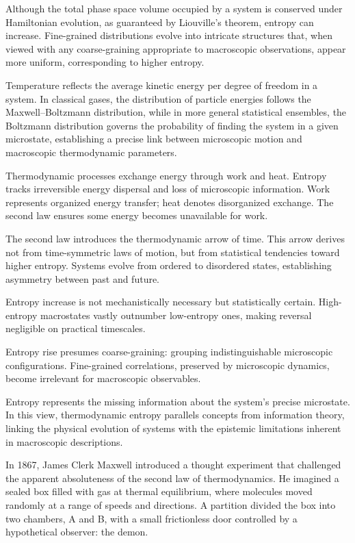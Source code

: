 Although the total phase space volume occupied by a system is conserved under Hamiltonian evolution, as guaranteed by Liouville's theorem, entropy can increase. Fine-grained distributions evolve into intricate structures that, when viewed with any coarse-graining appropriate to macroscopic observations, appear more uniform, corresponding to higher entropy.

Temperature reflects the average kinetic energy per degree of freedom in a system. In classical gases, the distribution of particle energies follows the Maxwell–Boltzmann distribution, while in more general statistical ensembles, the Boltzmann distribution governs the probability of finding the system in a given microstate, establishing a precise link between microscopic motion and macroscopic thermodynamic parameters.

Thermodynamic processes exchange energy through work and heat. Entropy tracks irreversible energy dispersal and loss of microscopic information. Work represents organized energy transfer; heat denotes disorganized exchange. The second law ensures some energy becomes unavailable for work.

The second law introduces the thermodynamic arrow of time. This arrow derives not from time-symmetric laws of motion, but from statistical tendencies toward higher entropy. Systems evolve from ordered to disordered states, establishing asymmetry between past and future.

Entropy increase is not mechanistically necessary but statistically certain. High-entropy macrostates vastly outnumber low-entropy ones, making reversal negligible on practical timescales.

Entropy rise presumes coarse-graining: grouping indistinguishable microscopic configurations. Fine-grained correlations, preserved by microscopic dynamics, become irrelevant for macroscopic observables.

Entropy represents the missing information about the system's precise microstate. In this view, thermodynamic entropy parallels concepts from information theory, linking the physical evolution of systems with the epistemic limitations inherent in macroscopic descriptions.

In 1867, James Clerk Maxwell introduced a thought experiment that challenged the apparent absoluteness of the second law of thermodynamics. He imagined a sealed box filled with gas at thermal equilibrium, where molecules moved randomly at a range of speeds and directions. A partition divided the box into two chambers, A and B, with a small frictionless door controlled by a hypothetical observer: the demon.

